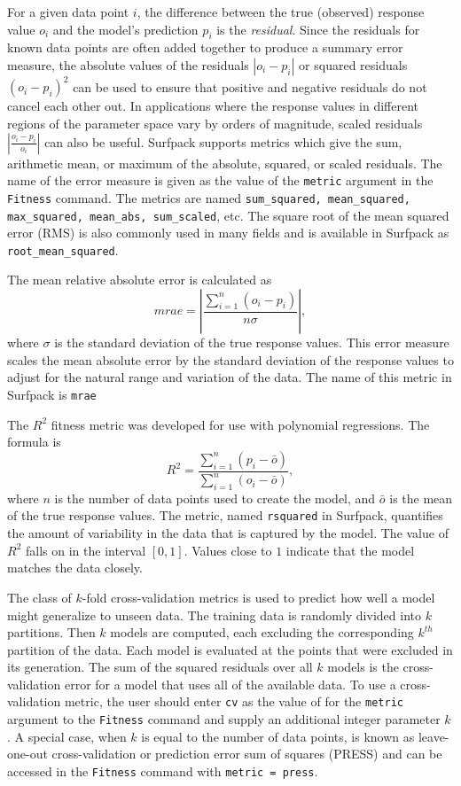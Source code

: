\documentclass{article}
\begin{document}
For a given data point $i$, the difference between the true (observed) response value $o_i$ and the model's prediction $p_i$ is the {\em residual}.  Since the residuals for known data points are often added together to produce a summary error measure, the absolute values of the residuals $|o_i - p_i|$ or squared residuals $(o_i - p_i)^2$ can be used to ensure that positive and negative residuals do not cancel each other out.  In applications where the response values in different regions of the parameter space vary by orders of magnitude, scaled residuals $|\frac{o_i - p_i}{o_i}|$ can also be useful.  Surfpack supports metrics which give the sum, arithmetic mean, or maximum of the absolute, squared, or scaled residuals.  The name of the error measure is given as the value of the \texttt{metric} argument in the \texttt{Fitness} command.  The metrics are named \texttt{sum\_squared, mean\_squared, max\_squared, mean\_abs, sum\_scaled}, etc.  The square root of the mean squared error (RMS) is also commonly used in many fields and is available in Surfpack as \texttt{root\_mean\_squared}.  

The mean relative absolute error is calculated as
\begin{equation}
  mrae = \left| \frac{ \sum_{i=1}^{n}{\left(o_i - p_i\right)}}{n\sigma} \right|,
\end{equation}
where $\sigma$ is the standard deviation of the true response values.  This error measure scales the mean absolute error by the standard deviation of the response values to adjust for the natural range and variation of the data.  The name of this metric in Surfpack is \texttt{mrae}

The $R^2$ fitness metric was developed for use with polynomial regressions.  The formula is
\begin{equation}
  R^2 = \frac{\sum_{i=1}^{n}{\left(p_i - \bar{o}\right)}}{ \sum_{i=1}^{n}{\left(o_i - \bar{o}\right)}},
\end{equation}
where $n$ is the number of data points used to create the model, and $\bar{o}$ is the mean of the true response values.  The metric, named \texttt{rsquared} in Surfpack, quantifies the amount of variability in the data that is captured by the model.  The value of $R^2$ falls on in the interval $[0,1]$.  Values close to $1$ indicate that the model matches the data closely.

The class of $k$-fold cross-validation metrics is used to predict how well a model might generalize to unseen data.  The training data is randomly divided into $k$ partitions.  Then $k$ models are computed, each excluding the corresponding $k^{th}$ partition of the data.  Each model is evaluated at the points that were excluded in its generation.  The sum of the squared residuals over all $k$ models is the cross-validation error for a model that uses all of the available data.  To use a cross-validation metric, the user should enter \texttt{cv} as the value of for the \texttt{metric} argument to the \texttt{Fitness} command and supply an additional integer parameter $k$.  A special case, when $k$ is equal to the number of data points, is known as leave-one-out cross-validation or prediction error sum of squares (PRESS) and can be accessed in the \texttt{Fitness} command with \texttt{metric = press}.
\end{document}
